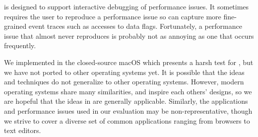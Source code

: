 \xxx is designed to support interactive debugging of performance issues. It
sometimes requires the user to reproduce a performance issue so \xxx can capture
more fine-grained event traces such as accesses to data flags. Fortunately, a
performance issue that almost never reproduces is probably not as annoying as
one that occurs frequently.

We implemented \xxx in the closed-source macOS which presents a harsh test
for \xxx, but we have not ported \xxx to other operating systems yet. It is
possible that the ideas and techniques do not generalize to other operating
systems. However, modern operating systems share many similarities, and inspire
each others' designs, so we are hopeful that the ideas in \xxx are generally
applicable. Similarly, the applications and performance issues used in our
evaluation may be non-representative, though we strive to cover a diverse set of
common applications ranging from browsers to text editors.
